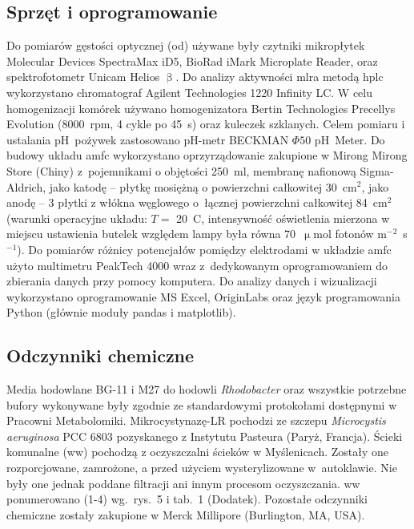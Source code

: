 \subsection{Sprzęt i oprogramowanie}\label{subsec:sprzet}
Do pomiarów gęstości optycznej (\acrshort{od}) używane były czytniki mikropłytek
Molecular Devices SpectraMax iD5, BioRad iMark
Microplate Reader, oraz spektrofotometr Unicam Helios $\upbeta$.
Do analizy aktywności \acrshort{mlra} metodą \acrshort{hplc} wykorzystano chromatograf
Agilent Technologies 1220 Infinity LC\@.
W celu homogenizacji komórek używano homogenizatora
Bertin Technologies Precellys Evolution (8000~rpm, 4 cykle po 45~s)
oraz kuleczek szklanych.
Celem pomiaru i ustalania pH~pożywek zastosowano pH-metr
BECKMAN $\Phi 50$ pH~Meter.
Do budowy układu \acrshort{amfc} wykorzystano oprzyrządowanie
zakupione w Mirong Mirong Store (Chiny) z~pojemnikami
o objętości 250~ml, membranę nafionową Sigma-Aldrich,
jako katodę -- płytkę mosiężną o powierzchni całkowitej 30~cm$^{2}$,
jako anodę -- 3 płytki z włókna węglowego
o~łącznej powierzchni całkowitej 84~cm$^{2}$
(warunki operacyjne układu:
$T =$ 20~\degree C, intensywność oświetlenia mierzona w miejscu
ustawienia butelek względem lampy była równa
70~$\upmu$mol fotonów m$^{-2}$~s$^{-1}$).
Do pomiarów różnicy potencjałów pomiędzy elektrodami
w układzie \acrshort{amfc} użyto multimetru PeakTech 4000 wraz
z~dedykowanym oprogramowaniem do zbierania danych przy pomocy komputera.
Do analizy danych i wizualizacji wykorzystano oprogramowanie
MS Excel, OriginLabs oraz język programowania Python
(głównie moduły pandas i matplotlib).

\subsection{Odczynniki chemiczne}\label{subsec:odczynniki}
Media hodowlane BG-11 i M27 do hodowli \textit{Rhodobacter} oraz
wszystkie potrzebne bufory wykonywane były zgodnie ze standardowymi
protokołami dostępnymi w Pracowni Metabolomiki.
Mikrocystynazę-LR pochodzi ze szczepu \textit{Microcystis aeruginosa} PCC 6803
pozyskanego z Instytutu Pasteura (Paryż, Francja).
Ścieki komunalne (\acrshort{ww}) pochodzą z oczyszczalni ścieków w Myślenicach.
Zostały one rozporcjowane, zamrożone, a przed użyciem wysterylizowane w~autoklawie.
Nie były one jednak poddane filtracji ani innym procesom oczyszczania.
\acrshort{ww} ponumerowano (1-4) wg.\ rys.~5 i tab.~1 (Dodatek).
Pozostałe odczynniki chemiczne zostały zakupione
w Merck Millipore (Burlington, MA, USA).

